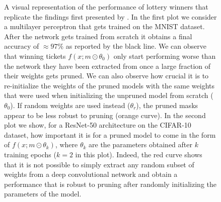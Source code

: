 \begin{figure}[ht!]


    \caption{A visual representation of the performance of lottery winners that replicate the findings first presented by \citet{frankle2018lottery}. In the first plot we consider a multilayer perceptron that gets trained on the MNIST dataset. After the network gets trained from scratch it obtains a final accuracy of $\approx 97\%$ as reported by the black line. We can observe that winning tickets $f(x;m\odot\theta_0)$ only start performing worse than the network they have been extracted from once a large fraction of their weights gets pruned. We can also observe how crucial it is to re-initialize the weights of the pruned models with the same weights that were used when initializing the unpruned model from scratch ($\theta_0$). If random weights are used instead ($\theta_r$), the pruned masks appear to be less robust to pruning (orange curve). In the second plot we show, for a  ResNet-50 architecture on the CIFAR-10 dataset, how important it is for a pruned model to come in the form of $f(x;m \odot\theta_k)$, where $\theta_k$ are the parameters obtained after $k$ training epochs ($k=2$ in this plot). Indeed, the red curve shows that it is not possible to simply extract any random subset of weights from a deep convolutional network and obtain a performance that is robust to pruning after randomly initializing the parameters of the model.}
    \label{fig:original_lth_results}
\end{figure} 
